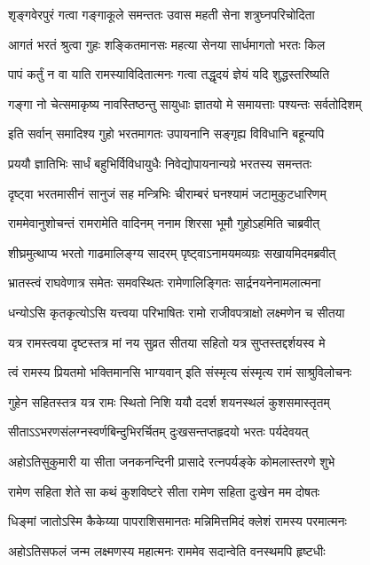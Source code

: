 \twolineshloka
{शृङ्गवेरपुरं गत्वा गङ्गाकूले समन्ततः}
{उवास महती सेना शत्रुघ्नपरिचोदिता} %

\twolineshloka
{आगतं भरतं श्रुत्वा गुहः शङ्कितमानसः}
{महत्या सेनया सार्धमागतो भरतः किल} %

\twolineshloka
{पापं कर्तुं न वा याति रामस्याविदितात्मनः}
{गत्वा तद्धृदयं ज्ञेयं यदि शुद्धस्तरिष्यति} %

\twolineshloka
{गङ्गा नो चेत्समाकृष्य नावस्तिष्ठन्तु सायुधाः}
{ज्ञातयो मे समायत्ताः पश्यन्तः सर्वतोदिशम्} %

\twolineshloka
{इति सर्वान् समादिश्य गुहो भरतमागतः}
{उपायनानि सङ्गृह्य विविधानि बहून्यपि} %

\twolineshloka
{प्रययौ ज्ञातिभिः सार्धं बहुभिर्विविधायुधैः}
{निवेद्योपायनान्यग्रे भरतस्य समन्ततः} %

\twolineshloka
{दृष्ट्वा भरतमासीनं सानुजं सह मन्त्रिभिः}
{चीराम्बरं घनश्यामं जटामुकुटधारिणम्} %

\twolineshloka
{राममेवानुशोचन्तं रामरामेति वादिनम्}
{ननाम शिरसा भूमौ गुहोऽहमिति चाब्रवीत्} %

\twolineshloka
{शीघ्रमुत्थाप्य भरतो गाढमालिङ्ग्य सादरम्}
{पृष्ट्वाऽनामयमव्यग्रः सखायमिदमब्रवीत्} %

\twolineshloka
{भ्रातस्त्वं राघवेणात्र समेतः समवस्थितः}
{रामेणालिङ्गितः सार्द्रनयनेनामलात्मना} %

\twolineshloka
{धन्योऽसि कृतकृत्योऽसि यत्त्वया परिभाषितः}
{रामो राजीवपत्राक्षो लक्ष्मणेन च सीतया} %

\twolineshloka
{यत्र रामस्त्वया दृष्टस्तत्र मां नय सुव्रत}
{सीतया सहितो यत्र सुप्तस्तद्दर्शयस्व मे} %

\twolineshloka
{त्वं रामस्य प्रियतमो भक्तिमानसि भाग्यवान्}
{इति संस्मृत्य संस्मृत्य रामं साश्रुविलोचनः} %

\twolineshloka
{गुहेन सहितस्तत्र यत्र रामः स्थितो निशि}
{ययौ ददर्श शयनस्थलं कुशसमास्तृतम्} %

\twolineshloka
{सीताऽऽभरणसंलग्नस्वर्णबिन्दुभिरर्चितम्}
{दुःखसन्तप्तहृदयो भरतः पर्यदेवयत्} %

\twolineshloka
{अहोऽतिसुकुमारी या सीता जनकनन्दिनी}
{प्रासादे रत्नपर्यङ्के कोमलास्तरणे शुभे} %

\twolineshloka
{रामेण सहिता शेते सा कथं कुशविष्टरे}
{सीता रामेण सहिता दुःखेन मम दोषतः} %

\twolineshloka
{धिङ्मां जातोऽस्मि कैकेय्या पापराशिसमानतः}
{मन्निमित्तमिदं क्लेशं रामस्य परमात्मनः} %

\twolineshloka
{अहोऽतिसफलं जन्म लक्ष्मणस्य महात्मनः}
{राममेव सदान्वेति वनस्थमपि हृष्टधीः} %

